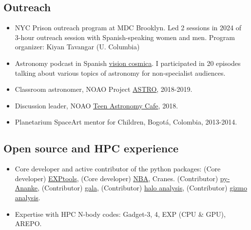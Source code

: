 \documentclass[14pt]{article}
\begin{document}
\subsection*{Outreach}
\begin{itemize}
  \setlength\itemsep{0.0em}
  \renewcommand\labelitemi{$\cdot$}
\item NYC Prison outreach program at MDC Brooklyn. Led 2 sessions in 2024 of 3-hour outreach
  session with Spanish-speaking women and men. Program organizer: Kiyan Tavangar (U. Columbia) 
\item Astronomy podcast in Spanish \href{https://cosmoquest.org/x/visioncosmica/nuestro-equipo/}{vision
  cosmica}. I participated in 20 episodes talking about various topics of
  astronomy for non-specialist audiences. 
\item Classroom astronomer, NOAO Project \href{https://www.noao.edu/education/astro/}{ASTRO}, 2018-2019.
\item Discussion leader, NOAO \href{http://www.teenastronomycafe.org/}{Teen Astronomy Cafe}, 2018.
\item Planetarium SpaceArt mentor for Children, Bogot\'a, Colombia, 2013-2014.
\end{itemize}



\subsection*{Open source and HPC experience}

\begin{itemize}
  \setlength\itemsep{0.0em}
  \renewcommand\labelitemi{$\cdot$}
  \item Core developer and active contributor of the python packages:
    (Core developer) \href{https://github.com/EXP-code/EXP_tools}{EXPtools}, 
    (Core developer) \href{https://github.com/jngaravitoc/nba}{NBA}, Cranes. 
    (Contributor) \href{https://github.com/athob/py-ananke}{py-Ananke},
    (Contributor) \href{https://gala.adrian.pw/en/latest/}{gala},
    (Contributor) \href{https://bitbucket.org/awetzel/halo_analysis/src/master/}{halo analysis},
    (Contributor) \href{https://bitbucket.org/awetzel/gizmo_analysis/src/master/}{gizmo analysis}.
  \item Expertise with HPC N-body codes: Gadget-3, 4, EXP (CPU \& GPU), AREPO.  

\end{itemize}
\end{document}
